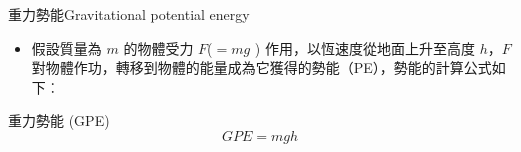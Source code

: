 \documentclass[beamer=true]{standalone}
\begin{document}




\begin{frame}{重力勢能Gravitational potential energy}
    \begin{itemize}
        \item 假設質量為 $m$ 的物體受力 $F$($=mg$ ) 作用，以恆速度從地面上升至高度 $h$，$F$ 對物體作功，轉移到物體的能量成為它獲得的勢能（PE），勢能的計算公式如下︰
    \end{itemize}
    \bigskip
    \begin{alertblock}
        {重力勢能 (GPE)}
        \begin{equation}
            GPE=mgh
        \end{equation}
    \end{alertblock}
\end{frame}
\end{document}
